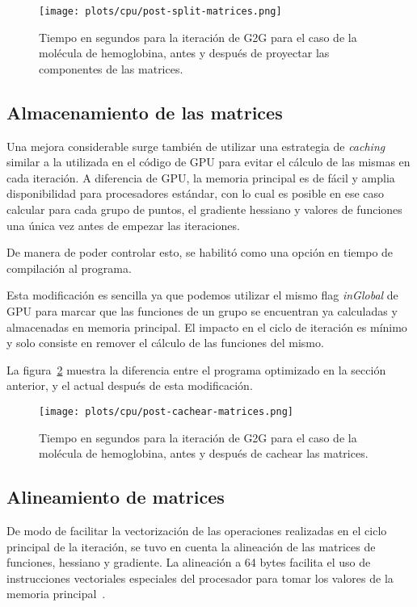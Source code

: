 \begin{figure}[htbp]
   \centering
   \texttt{[image: plots/cpu/post-split-matrices.png]}
   \caption{Tiempo en segundos para la iteraci\'on de G2G para el caso de la
   mol\'ecula de hemoglobina, antes y despu\'es de proyectar las componentes
   de las matrices.}
   \label{fig:lio-post-partir-mats}
\end{figure}

\subsection{Almacenamiento de las matrices}

Una mejora considerable surge tambi\'en de utilizar una estrategia de \textit{caching}
similar a la utilizada en el c\'odigo de GPU para evitar el c\'alculo de las mismas
en cada iteraci\'on. A diferencia de GPU, la memoria principal es de f\'acil y
amplia disponibilidad para procesadores est\'andar, con lo cual es posible en ese
caso calcular para cada grupo de puntos, el gradiente hessiano y valores de
funciones una \'unica vez antes de empezar las iteraciones.

De manera de poder controlar esto, se habilit\'o como una opci\'on en tiempo de
compilaci\'on al programa.

Esta modificaci\'on es sencilla ya que podemos utilizar el mismo flag
\textit{inGlobal} de GPU para marcar que las funciones de un grupo se encuentran
ya calculadas y almacenadas en memoria principal. El impacto en el ciclo de
iteraci\'on es m\'inimo y solo consiste en remover el c\'alculo de las funciones
del mismo.

La figura~\ref{fig:lio-post-cachear} muestra la diferencia entre el programa
optimizado en la secci\'on anterior, y el actual despu\'es de esta modificaci\'on.

\begin{figure}[htbp]
   \centering
   \texttt{[image: plots/cpu/post-cachear-matrices.png]}
   \caption{Tiempo en segundos para la iteraci\'on de G2G para el caso de la
   mol\'ecula de hemoglobina, antes y despu\'es de cachear las matrices.}
   \label{fig:lio-post-cachear}
\end{figure}

\subsection{Alineamiento de matrices}

De modo de facilitar la vectorizaci\'on de las operaciones realizadas en el
ciclo principal de la iteraci\'on, se tuvo en cuenta la alineaci\'on de las
matrices de funciones, hessiano y gradiente. La alineaci\'on a 64 bytes facilita
el uso de instrucciones vectoriales especiales del procesador para tomar los
valores de la memoria principal~\cite{AutovectorizationGuide}.

